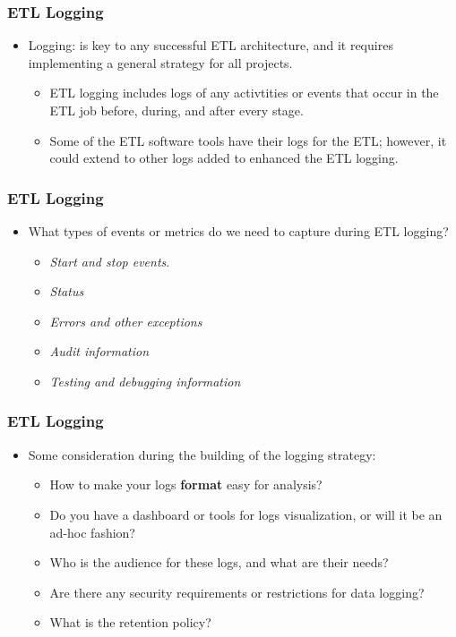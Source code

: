 \begin{frame}
	\frametitle{ETL Logging}
	\begin{itemize}[<+->]
		\item Logging: is key to any successful ETL architecture, and it requires implementing a general strategy for all projects.

		\begin{itemize}[<+->]
			\item ETL logging includes logs of any activtities or events that occur in the ETL job before, during, and after every stage.
			\item Some of the ETL software tools have their logs for the ETL; however, it could extend to other logs added to enhanced the ETL logging.
		\end{itemize}
	\end{itemize}
\end{frame}


\begin{frame}
	\frametitle{ETL Logging}
	\begin{itemize}[<+->]

		\item What types of events or metrics do we need to capture during ETL logging?
		\begin{itemize}[<+->]

			\item \textit{Start and stop events}.
			\item \textit{Status}
			\item \textit{Errors and other exceptions}
			\item \textit{Audit information}
			\item \textit{Testing and debugging information}
		\end{itemize}
	\end{itemize}
\end{frame}


\begin{frame}
	\frametitle{ETL Logging}
	\begin{itemize}[<+->]

		\item Some consideration during the building of the logging strategy:
		\begin{itemize}[<+->]
			\item How to make your logs \textbf{format} easy for analysis?
			\item Do you have a dashboard or tools for logs visualization, or will it be an ad-hoc fashion?
			\item Who is the audience for these logs, and what are their needs?
			\item Are there any security requirements or restrictions for data logging?
			\item What is the retention policy?
		\end{itemize}
	\end{itemize}
\end{frame}


